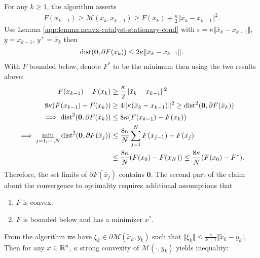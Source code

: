 \documentclass[12pt]{article}
\begin{document}
        For any $k \ge 1$, the algorithm asserts 
        \begin{align*}
            F(x_{k - 1}) \ge \mathcal M(\bar x_k, x_{k - 1}) \ge 
            F(x_k) + \frac{\kappa}{2}\Vert \bar x_k - x_{k - 1}\Vert^2. 
        \end{align*}
        Use Lemma \ref*{app:lemma:ncnvx-catalyst-stationary-cond} with $\epsilon = \kappa \Vert \bar x_k - x_{k - 1}\Vert$, $y = x_{k - 1}$, $y^+ = \bar x_k$ then 
        \begin{align*}
            \operatorname{dist}(\mathbf 0, \partial F(\bar x_k)) \le 2 \kappa \Vert \bar x_k - x_{k - 1} \Vert. 
        \end{align*}
        With $F$ bounded below, denote $F^*$ to be the minimum then using the two results above: 
        \begin{align*}
            F(x_{k - 1}) - F(x_k) 
            &\ge \frac{\kappa}{2}\Vert \bar x_k - x_{k - 1}\Vert^2
            \\
            8 \kappa (F(x_{k - 1}) - F(x_k)) &\ge 4 \Vert \kappa (\bar x_k - x_{k - 1})\Vert^2 \ge 
            \operatorname{dist}^2(\mathbf 0, \partial F(\bar x_k))
            \\
            \implies 
            \operatorname{dist}^2(\mathbf 0, \partial F(\bar x_k)) 
            &\le 
            8 \kappa (F(x_{k - 1}) - F(x_k))
            \\
            \implies 
            \min_{j = 1, \cdots, N} \operatorname{dist}^2(\mathbf 0, \partial F(\bar x_j))
            &\le 
            \frac{8\kappa}{N}
            \sum_{j = 1}^{N} F(x_{j - 1}) - F(x_j)
            \\
            &\le 
            \frac{8 \kappa}{N} (F(x_0) - F(x_N)) 
            \le \frac{8 \kappa}{N}(F(x_0) - F^*). 
        \end{align*}
        Therefore, the set limits of $\partial F(\bar x_j)$ contains $\mathbf 0$. 
        The second part of the claim about the convergence to optimality requires additional assumptions that 
        \begin{enumerate}
            \item $F$ is convex. 
            \item $F$ is bounded below and has a minimizer $x^*$. 
        \end{enumerate}
        From the algorithm we have $\xi_k \in \partial \mathcal M(\tilde x_k, y_k)$ such that $\Vert \xi_k\Vert \le \frac{\kappa}{k + 1}\Vert \tilde x_k - y_k\Vert$. 
        Then for any $x\in \mathbb R^n$, $\kappa$ strong convexity of $\mathcal M(\cdot, y_k)$ yields inequality: 
\end{document}
